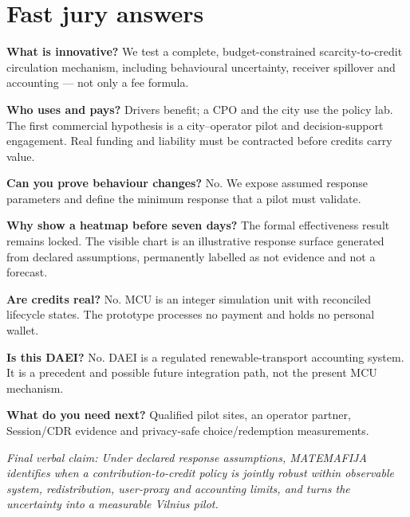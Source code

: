 \documentclass[11pt,a4paper]{article}
\begin{document}
\section*{Fast jury answers}
\textbf{What is innovative?} We test a complete, budget-constrained scarcity-to-credit circulation mechanism, including behavioural uncertainty, receiver spillover and accounting --- not only a fee formula.

\textbf{Who uses and pays?} Drivers benefit; a CPO and the city use the policy lab. The first commercial hypothesis is a city--operator pilot and decision-support engagement. Real funding and liability must be contracted before credits carry value.

\textbf{Can you prove behaviour changes?} No. We expose assumed response parameters and define the minimum response that a pilot must validate.

\textbf{Why show a heatmap before seven days?} The formal effectiveness result remains locked. The visible chart is an illustrative response surface generated from declared assumptions, permanently labelled as not evidence and not a forecast.

\textbf{Are credits real?} No. MCU is an integer simulation unit with reconciled lifecycle states. The prototype processes no payment and holds no personal wallet.

\textbf{Is this DAEI?} No. DAEI is a regulated renewable-transport accounting system. It is a precedent and possible future integration path, not the present MCU mechanism.

\textbf{What do you need next?} Qualified pilot sites, an operator partner, Session/CDR evidence and privacy-safe choice/redemption measurements.

\vfill
\small\textit{Final verbal claim: Under declared response assumptions, MATEMAFIJA identifies when a contribution-to-credit policy is jointly robust within observable system, redistribution, user-proxy and accounting limits, and turns the uncertainty into a measurable Vilnius pilot.}
\end{document}
